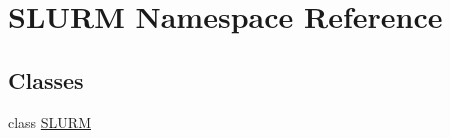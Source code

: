 \hypertarget{namespaceSLURM}{\section{S\-L\-U\-R\-M Namespace Reference}
\label{namespaceSLURM}
}
\subsection*{Classes}
\begin{DoxyCompactItemize}
\item 
class \hyperlink{classSLURM_1_1SLURM}{S\-L\-U\-R\-M}
\end{DoxyCompactItemize}
